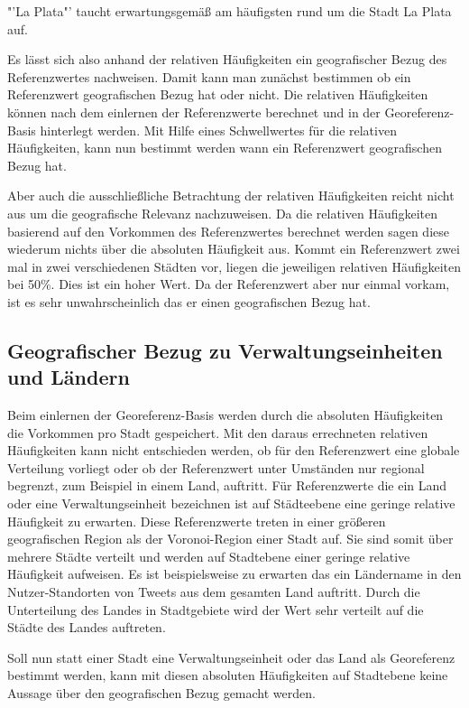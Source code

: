 				"'La Plata"' taucht erwartungsgemäß am häufigsten rund um die Stadt La Plata auf.  

				Es lässt sich also anhand der relativen Häufigkeiten ein geografischer Bezug des Referenzwertes nachweisen.
				Damit kann man zunächst bestimmen ob ein Referenzwert geografischen Bezug hat oder nicht.
				Die relativen Häufigkeiten können nach dem einlernen der Referenzwerte berechnet und in der Georeferenz-Basis hinterlegt werden.
				Mit Hilfe eines Schwellwertes für die relativen Häufigkeiten, kann nun bestimmt werden wann ein Referenzwert geografischen Bezug hat.

				Aber auch die ausschließliche Betrachtung der relativen Häufigkeiten reicht nicht aus um die geografische Relevanz nachzuweisen.
				Da die relativen Häufigkeiten basierend auf den Vorkommen des Referenzwertes berechnet werden sagen diese wiederum nichts über die absoluten Häufigkeit aus. 
				Kommt ein Referenzwert zwei mal in zwei verschiedenen Städten vor, liegen die jeweiligen relativen Häufigkeiten bei 50\%.
				Dies ist ein hoher Wert.
				Da der Referenzwert aber nur einmal vorkam, ist es sehr unwahrscheinlich das er einen geografischen Bezug hat.   

		\subsection{Geografischer Bezug zu Verwaltungseinheiten und Ländern} 

			Beim einlernen der Georeferenz-Basis werden durch die absoluten Häufigkeiten die Vorkommen pro Stadt gespeichert.
			Mit den daraus errechneten relativen Häufigkeiten kann nicht entschieden werden, ob für den Referenzwert eine globale Verteilung vorliegt oder ob der Referenzwert unter Umständen nur regional begrenzt, zum Beispiel in einem Land, auftritt.
			Für Referenzwerte die ein Land oder eine Verwaltungseinheit bezeichnen ist auf Städteebene eine geringe relative Häufigkeit zu erwarten.
			Diese Referenzwerte treten in einer größeren geografischen Region als der Voronoi-Region einer Stadt auf.
			Sie sind somit über mehrere Städte verteilt und werden auf Stadtebene einer geringe relative Häufigkeit aufweisen.
			Es ist beispielsweise zu erwarten das ein Ländername in den Nutzer-Standorten von Tweets aus dem gesamten Land auftritt.
			Durch die Unterteilung des Landes in Stadtgebiete wird der Wert sehr verteilt auf die Städte des Landes auftreten.

			Soll nun statt einer Stadt eine Verwaltungseinheit oder das Land als Georeferenz bestimmt werden, kann mit diesen absoluten Häufigkeiten auf Stadtebene keine Aussage über den geografischen Bezug gemacht werden. 
			

